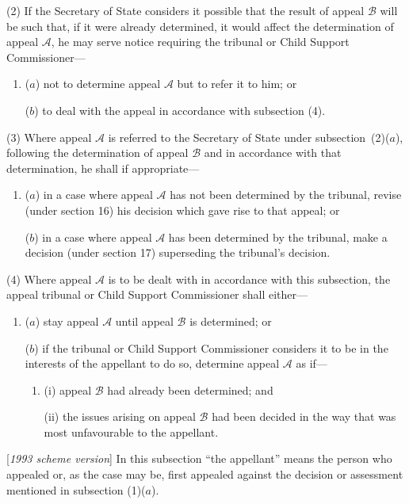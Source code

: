 \documentclass[12pt,a4paper]{article}
\begin{document}
(2) If the Secretary of State considers it possible that the result of appeal $\mathcal{B}$ will be such that, if it were already determined, it would affect the determination of appeal $\mathcal{A}$, he may serve notice requiring the tribunal or Child Support Commissioner—
\begin{enumerate}\item[]
($a$) not to determine appeal $\mathcal{A}$ but to refer it to him; or

($b$) to deal with the appeal in accordance with subsection (4).
\end{enumerate}

(3) Where appeal $\mathcal{A}$ is referred to the Secretary of State under subsection~(2)($a$), following the determination of appeal $\mathcal{B}$ and in accordance with that determination, he shall if appropriate—
\begin{enumerate}\item[]
($a$) in a case where appeal $\mathcal{A}$ has not been determined by the tribunal, revise (under section 16) his decision which gave rise to that appeal; or

($b$) in a case where appeal $\mathcal{A}$ has been determined by the tribunal, make a decision (under section 17) superseding the tribunal’s decision.
\end{enumerate}

(4) Where appeal $\mathcal{A}$ is to be dealt with in accordance with this subsection, the appeal tribunal or Child Support Commissioner shall either—
\begin{enumerate}\item[]
($a$) stay appeal $\mathcal{A}$ until appeal $\mathcal{B}$ is determined; or

($b$) if the tribunal or Child Support Commissioner considers it to be in the interests of the appellant to do so, determine appeal $\mathcal{A}$ as if—
\begin{enumerate}\item[]
(i) appeal $\mathcal{B}$ had already been determined; and

(ii) the issues arising on appeal $\mathcal{B}$ had been decided in the way that was most unfavourable to the appellant.
\end{enumerate}
\end{enumerate}

[\emph{1993 scheme version}] In this subsection “the appellant” means the person who appealed or, as the case may be, first appealed against the decision or assessment mentioned in subsection (1)($a$).
\end{document}
